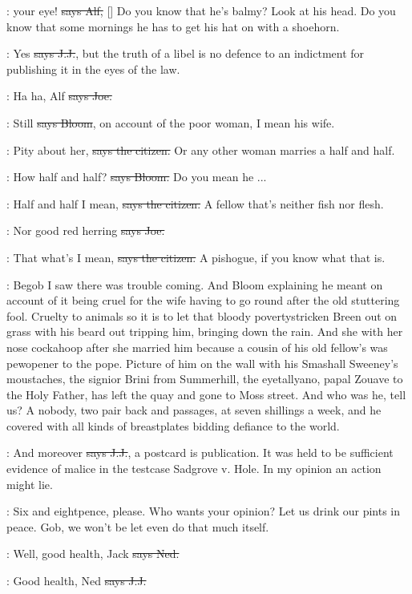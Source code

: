 \bergan:
 your eye!
\sout{says Alf,} []
Do you know that he's balmy?
Look at his head.
Do you know that some mornings he has to get his hat on
with a shoehorn.

\jjom:
Yes
\sout{says J.J.},
but the truth of a libel is no defence to an indictment
for publishing it in the eyes of the law.

\joe:
Ha ha,
Alf
\sout{says Joe.}

\Bloom:
Still
\sout{says Bloom},
on account of the poor woman,
I mean his wife.

\citizen:
Pity about her,
\sout{says the citizen.}
Or any other woman marries a half and half.

\Bloom:
How half and half?
\sout{says Bloom.}
Do you mean he ...

\citizen:
Half and half I mean,
\sout{says the citizen.}
A fellow that's neither fish nor flesh.

\joe:
Nor good red herring
\sout{says Joe.}

\citizen:
That what's I mean,
\sout{says the citizen.}
A pishogue,
if you know what that is.

\Nq:
Begob I saw there was trouble coming.
And Bloom explaining he meant on
account of it being cruel for the wife having to go round after the
old stuttering fool.
Cruelty to animals so it is to let that bloody
povertystricken Breen out on grass with his beard out tripping him,
bringing down the rain.
And she with her nose cockahoop after she married
him because a cousin of his old fellow's was pewopener to the pope.
Picture of him on the wall with his Smashall Sweeney's moustaches,
the
signior Brini from Summerhill,
the eyetallyano,
papal Zouave to the Holy
Father,
has left the quay and gone to Moss street.
And who was he,
tell
us?
A nobody,
two pair back and passages,
at seven shillings a week,
and
he covered with all kinds of breastplates
bidding defiance to the world.

\jjom:
And moreover
\sout{says J.J.},
a postcard is publication.
It was held to be
sufficient evidence of malice in the testcase Sadgrove v.
Hole.
In my
opinion an action might lie.

\Nq:
Six and eightpence,
please.
Who wants your opinion?
Let us drink
our pints in peace.
Gob,
we won't be let even do that much itself.

\lambert:
Well,
good health,
Jack
\sout{says Ned.}

\jjom:
Good health,
Ned
\sout{says J.J.}

